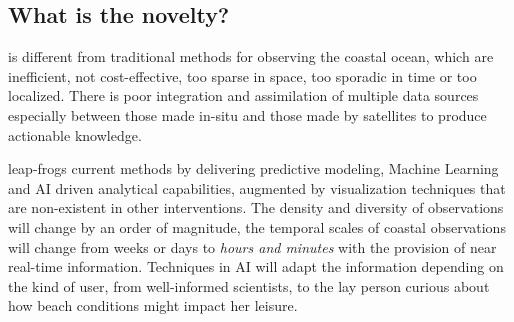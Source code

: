 \documentclass[12pt]{article}
\begin{document}


\vspace*{-0.2cm}
\subsection{What is the novelty?}

\pro is different from traditional methods for observing the coastal
ocean, which are inefficient, not cost-effective, too sparse in space,
too sporadic in time or too localized. There is poor integration and
assimilation of multiple data sources especially between those made
in-situ and those made by satellites to produce actionable knowledge.

\pro leap-frogs current methods by delivering predictive modeling,
Machine Learning and AI driven analytical capabilities, augmented by
visualization techniques that are non-existent in other interventions.
The density and diversity of observations will change by an order of
magnitude, the temporal scales of coastal observations will change
from weeks or days to \emph{hours and minutes} with the provision of
near real-time information. Techniques in AI will adapt the
information depending on the kind of user, from well-informed
scientists, to the lay person curious about how beach conditions might
impact her leisure.

\end{document}
